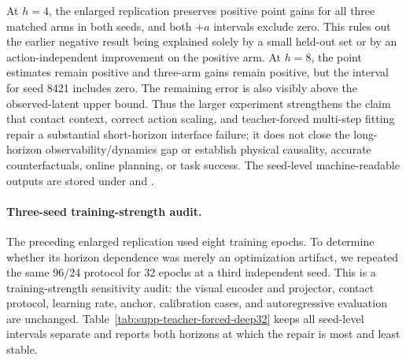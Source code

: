\documentclass{article}
\begin{document}
At $h=4$, the enlarged replication preserves positive point gains for all
three matched arms in both seeds, and both $+a$ intervals exclude zero. This
rules out the earlier negative result being explained solely by a small
held-out set or by an action-independent improvement on the positive arm.
At $h=8$, the point estimates remain positive and three-arm gains remain
positive, but the interval for seed 8421 includes zero. The remaining error is
also visibly above the observed-latent upper bound. Thus the larger experiment
strengthens the claim that contact context, correct action scaling, and
teacher-forced multi-step fitting repair a substantial short-horizon interface
failure; it does not close the long-horizon observability/dynamics gap or
establish physical causality, accurate counterfactuals, online planning, or
task success. The seed-level machine-readable outputs are stored under
 and
.

\paragraph{Three-seed training-strength audit.}
The preceding enlarged replication used eight training epochs. To determine
whether its horizon dependence was merely an optimization artifact, we repeated
the same 96/24 protocol for 32 epochs at a third independent seed. This is a
training-strength sensitivity audit: the visual encoder and projector, contact
protocol, learning rate, anchor, calibration cases, and autoregressive
evaluation are unchanged. Table~\ref{tab:supp-teacher-forced-deep32} keeps all
seed-level intervals separate and reports both horizons at which the repair is
most and least stable.
\end{document}
